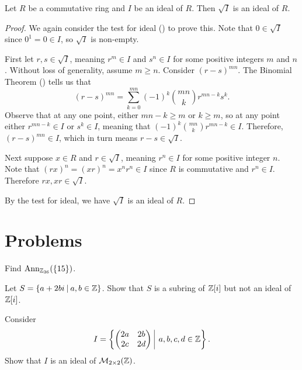 \begin{proposition}
    Let $R$ be a commutative ring and $I$ be an ideal of $R$. Then $\sqrt{I}$ is an ideal of $R$.
\end{proposition}
\begin{proof}
    We again consider the test for ideal () to prove this. Note that $0 \in \sqrt{I}$ since $0^1 = 0 \in I$, so $\sqrt{I}$ is non-empty.

    First let $r, s \in \sqrt{I}$, meaning $r^m \in I$ and $s^n \in I$ for some positive integers $m$ and $n$. Without loss of generality, assume $m \geq n$. Consider $(r-s)^{mn}$. The Binomial Theorem () tells us that
    \[
        (r-s)^{mn} = \sum_{k=0}^{mn}(-1)^k{mn \choose k}r^{mn-k}s^k.
    \]
    Observe that at any one point, either $mn - k \geq m$ or $k \geq m$, so at any point either $r^{mn-k} \in I$ or $s^k \in I$, meaning that $(-1)^k{mn \choose k}r^{mn-k} \in I$. Therefore, $(r-s)^{mn} \in I$, which in turn means $r-s \in \sqrt{I}$.

    Next suppose $x \in R$ and $r \in \sqrt{I}$, meaning $r^n \in I$ for some positive integer $n$. Note that $(rx)^n = (xr)^n = x^nr^n \in I$ since $R$ is commutative and $r^n \in I$. Therefore $rx, xr \in \sqrt{I}$.

    By the test for ideal, we have $\sqrt{I}$ is an ideal of $R$.
\end{proof}

\newpage

\section{Problems}
\begin{problem}
    Find $\mathrm{Ann}_{\mathbb{Z}_{36}}(\{15\})$.
\end{problem}

\begin{problem}
    Let $S = \{a + 2bi \vert a, b \in \Z\}$. Show that $S$ is a subring of $\mathbb{Z}[i]$ but not an ideal of $\mathbb{Z}[i]$.
\end{problem}

\begin{problem}
    Consider
    \[
        I = \left\{\begin{pmatrix}2a&2b\\2c&2d\end{pmatrix} \vert a,b,c,d \in \Z\right\}.
    \]
    Show that $I$ is an ideal of $\mathcal{M}_{2\times2}(\mathbb{Z})$.
\end{problem}

